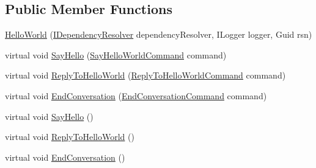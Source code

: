 \subsection*{Public Member Functions}
\begin{DoxyCompactItemize}
\item 
\hyperlink{classCqrs_1_1Akka_1_1Tests_1_1Unit_1_1Aggregates_1_1HelloWorld_a54c9de656ea141ad532d55ba33e94a56_a54c9de656ea141ad532d55ba33e94a56}{Hello\+World} (\hyperlink{interfaceCqrs_1_1Configuration_1_1IDependencyResolver}{I\+Dependency\+Resolver} dependency\+Resolver, I\+Logger logger, Guid rsn)
\item 
virtual void \hyperlink{classCqrs_1_1Akka_1_1Tests_1_1Unit_1_1Aggregates_1_1HelloWorld_a20af0c54b6a45906cde151ebd20c93a5_a20af0c54b6a45906cde151ebd20c93a5}{Say\+Hello} (\hyperlink{classCqrs_1_1Akka_1_1Tests_1_1Unit_1_1Commands_1_1SayHelloWorldCommand}{Say\+Hello\+World\+Command} command)
\item 
virtual void \hyperlink{classCqrs_1_1Akka_1_1Tests_1_1Unit_1_1Aggregates_1_1HelloWorld_a6e0f9b4297a292190a605c34741395a5_a6e0f9b4297a292190a605c34741395a5}{Reply\+To\+Hello\+World} (\hyperlink{classCqrs_1_1Akka_1_1Tests_1_1Unit_1_1Commands_1_1ReplyToHelloWorldCommand}{Reply\+To\+Hello\+World\+Command} command)
\item 
virtual void \hyperlink{classCqrs_1_1Akka_1_1Tests_1_1Unit_1_1Aggregates_1_1HelloWorld_a310c79f307749813d56872b41c9685f0_a310c79f307749813d56872b41c9685f0}{End\+Conversation} (\hyperlink{classCqrs_1_1Akka_1_1Tests_1_1Unit_1_1Commands_1_1EndConversationCommand}{End\+Conversation\+Command} command)
\item 
virtual void \hyperlink{classCqrs_1_1Akka_1_1Tests_1_1Unit_1_1Aggregates_1_1HelloWorld_a2c5e579e741dc3471e3532f5be3b98ab_a2c5e579e741dc3471e3532f5be3b98ab}{Say\+Hello} ()
\item 
virtual void \hyperlink{classCqrs_1_1Akka_1_1Tests_1_1Unit_1_1Aggregates_1_1HelloWorld_a6b3c07d040e703d89c7a065064776623_a6b3c07d040e703d89c7a065064776623}{Reply\+To\+Hello\+World} ()
\item 
virtual void \hyperlink{classCqrs_1_1Akka_1_1Tests_1_1Unit_1_1Aggregates_1_1HelloWorld_aeeb20725d192b64adf47281d37dd198d_aeeb20725d192b64adf47281d37dd198d}{End\+Conversation} ()
\end{DoxyCompactItemize}
